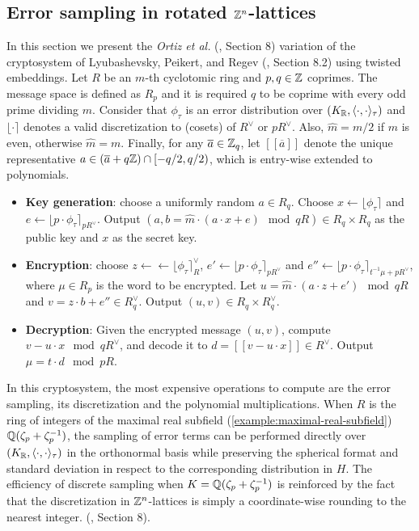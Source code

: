 \documentclass[a4paper,12pt]{article}
\begin{document}
\subsection{Error sampling in rotated \(\mathbb{Z}^n\)-lattices}
\label{sec:orgf838f9f}

\begin{text}
  In this section we present the \textit{Ortiz et al.} (\cite{Ortiz2021}, Section 8)
  variation of the cryptosystem of Lyubashevsky, Peikert, and Regev
  (\cite{LPV2013}, Section 8.2) using twisted embeddings. Let $R$ be an $m$-th
  cyclotomic ring and $p, q \in \mathbb{Z}$ coprimes. The message space is defined as
  $R_p$ and it is required $q$ to be coprime with every odd prime dividing
  $m$. Consider that $\phi_\tau$ is an error distribution over $(K_{\mathbb{R}},\langle{\cdot,\cdot}\rangle_\tau)$
  and $\lfloor{\cdot}\rceil$ denotes a valid discretization to (cosets) of $R^\vee$ or $pR^\vee$.
  Also, $\hat{m} = m/2$ if $m$ is even, otherwise $\hat{m} = m$. Finally, for any
  $\overline{a} \in \mathbb{Z}_q$, let $[[\overline{a}]]$ denote the unique representative
  $a \in (\overline{a} + q\mathbb{Z}) \cap [-q/2, q/2)$, which is entry-wise extended to
  polynomials.

  \begin{itemize}
  \item \textbf{Key generation}: choose a uniformly random $a \in R_q$. Choose $x
    \longleftarrow \lfloor{\phi_\tau}\rceil$ and $e \longleftarrow \lfloor{p \cdot \phi_\tau}\rceil_{pR^\vee}$. Output $(a,b = \hat{m}\cdot(a \cdot x + e)
    \mod{qR} ) \in R_q \times R_q$ as the public key and $x$ as the secret key.
  \item \textbf{Encryption}: choose $z \longleftarrow \longleftarrow \lfloor{\phi_\tau}\rceil_R^\vee$, $e' \longleftarrow \lfloor{p \cdot
      \phi_\tau}\rceil_{pR^\vee}$ and  $e'' \longleftarrow \lfloor{p \cdot \phi_\tau}\rceil_{t^{-1}\mu +pR^\vee}$, where $\mu \in R_p$ is
    the word to be encrypted. Let $u = \hat{m} \cdot (a \cdot z + e') \mod{qR}$ and $v =
    z \cdot b + e'' \in R_q^\vee$. Output $(u,v) \in R_q \times R^\vee_q$.
  \item \textbf{Decryption}: Given the encrypted message $(u,v)$, compute $v - u
    \cdot x \mod{qR^\vee}$, and decode it to $d = [[v - u \cdot x]] \in R^\vee$. Output $\mu = t \cdot
    d \mod{pR}$. 
  \end{itemize}

  In this cryptosystem, the most expensive operations to compute are the error sampling, its discretization and the polynomial multiplications. When $R$ is
  the ring of integers of the maximal real subfield
  (\ref{example:maximal-real-subfield}) $\mathbb{Q}(\zeta_{p} + \zeta_{p} ^{-1})$, the sampling of error terms can be performed directly over $(K_{\mathbb{R}}, \langle{\cdot,\cdot}\rangle_\tau)$ in the orthonormal basis while preserving the spherical format and standard deviation in respect to the corresponding distribution in $H$. The efficiency
of discrete sampling when $K = \mathbb{Q}(\zeta_p + \zeta_p^{-1})$ is reinforced by the fact
that the discretization in $\mathbb{Z}^n$-lattices is simply a coordinate-wise rounding to the nearest integer. (\cite{Ortiz2021}, Section 8).
\end{text}
\end{document}

